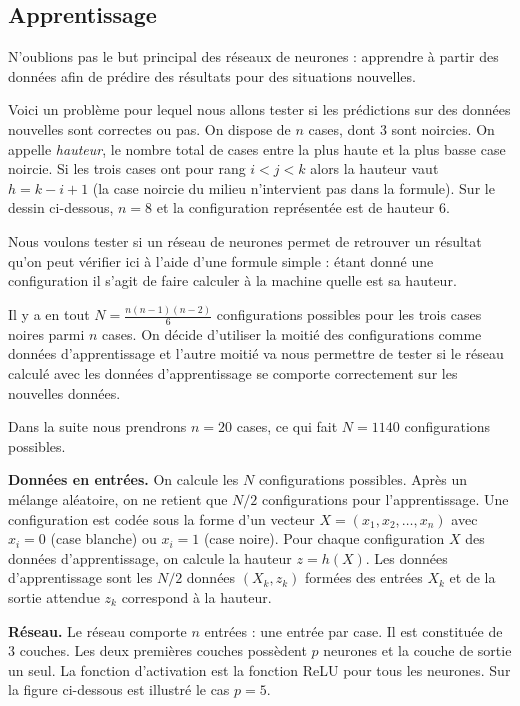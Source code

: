 \subsection{Apprentissage}

N'oublions pas le but principal des réseaux de neurones : apprendre à partir des données afin de prédire des résultats pour des situations nouvelles.


Voici un problème pour lequel nous allons tester si les prédictions sur des données nouvelles sont correctes ou pas.
On dispose de $n$ cases, dont $3$ sont noircies.  On appelle \emph{hauteur}, le nombre total de cases entre la plus haute et la plus basse case noircie. Si les trois cases ont pour rang $i < j <k$ alors la hauteur vaut $h = k-i+1$ (la case noircie du milieu n'intervient pas dans la formule).
Sur le dessin ci-dessous, $n=8$ et la configuration représentée est de hauteur $6$.


Nous voulons tester si un réseau de neurones permet de retrouver un résultat qu'on peut vérifier ici à l'aide d'une formule simple :
étant donné une configuration il s'agit de faire calculer à la machine quelle est sa hauteur. 

Il y a en tout $N = \frac{n(n-1)(n-2)}{6}$ configurations possibles pour les trois cases noires parmi $n$ cases.
On décide d'utiliser la moitié des configurations comme données d'apprentissage et l'autre moitié va nous permettre de tester si le réseau calculé avec les données d'apprentissage se comporte \og{} correctement\fg{} sur les nouvelles données.

Dans la suite nous prendrons $n=20$ cases, ce qui fait $N=1140$ configurations possibles.

\textbf{Données en entrées.}
On calcule les $N$ configurations possibles. Après un mélange aléatoire, on ne retient que $N/2$ configurations pour l'apprentissage. Une configuration est codée sous la forme d'un vecteur
$X = (x_1,x_2,\ldots,x_n)$ avec $x_i=0$ (case blanche) ou $x_i = 1$ (case noire).
Pour chaque configuration $X$ des données d'apprentissage, on calcule la hauteur $z = h(X)$. Les données d'apprentissage sont les $N/2$ données $(X_k,z_k)$ formées des entrées $X_k$ et de la sortie attendue $z_k$ correspond à la hauteur. 

\textbf{Réseau.}
Le réseau comporte $n$ entrées : une entrée par case. Il est constituée de $3$ couches.
Les deux premières couches possèdent $p$ neurones et la couche de sortie un seul. La fonction d'activation est la fonction ReLU pour tous les neurones. Sur la figure ci-dessous est illustré le cas $p=5$.

